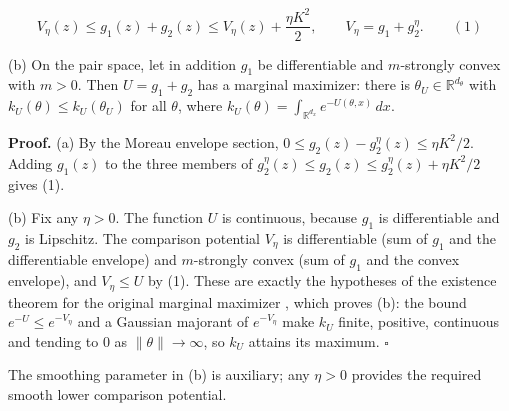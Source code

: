 \documentclass[11pt,a4paper]{article}
\begin{document}
\[V_\eta(z)\le g_1(z)+g_2(z)\le V_\eta(z)+\frac{\eta K^2}{2},\qquad V_\eta=g_1+g_2^\eta.\qquad(1)\]


(b) On the pair space, let in addition \(g_1\) be differentiable and \(m\)-strongly convex with \(m>0\). Then \(U=g_1+g_2\) has a marginal maximizer: there is \(\theta_U\in\mathbb R^{d_\theta}\) with \(k_U(\theta)\le k_U(\theta_U)\) for all \(\theta\), where \(k_U(\theta)=\int_{\mathbb R^{d_x}}e^{-U(\theta,x)}\,dx\).




\textbf{Proof.} (a) By the Moreau envelope section, \(0\le g_2(z)-g_2^\eta(z)\le\eta K^2/2\). Adding \(g_1(z)\) to the three members of \(g_2^\eta(z)\le g_2(z)\le g_2^\eta(z)+\eta K^2/2\) gives (1).




(b) Fix any \(\eta>0\). The function \(U\) is continuous, because \(g_1\) is differentiable and \(g_2\) is Lipschitz. The comparison potential \(V_\eta\) is differentiable (sum of \(g_1\) and the differentiable envelope) and \(m\)-strongly convex (sum of \(g_1\) and the convex envelope), and \(V_\eta\le U\) by (1). These are exactly the hypotheses of the existence theorem for the original marginal maximizer \cite[Section~3.4.3]{LangevinLean2026Proximal}, which proves (b): the bound \(e^{-U}\le e^{-V_\eta}\) and a Gaussian majorant of \(e^{-V_\eta}\) make \(k_U\) finite, positive, continuous and tending to \(0\) as \(\|\theta\|\to\infty\), so \(k_U\) attains its maximum. \(\square\)




The smoothing parameter in (b) is auxiliary; any \(\eta>0\) provides the required smooth lower comparison potential.
\end{document}
